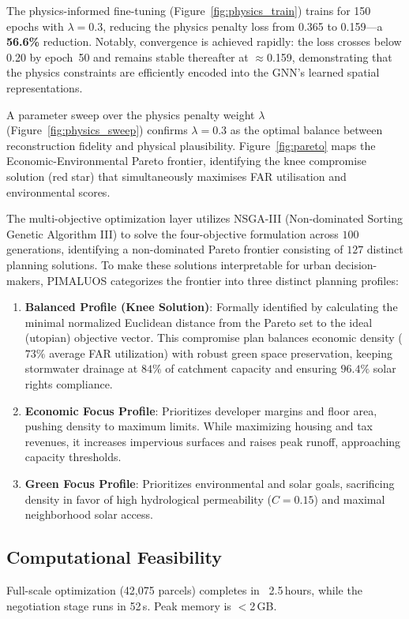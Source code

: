 \documentclass[final,3p,times]{elsarticle}
\begin{document}
The physics-informed fine-tuning (Figure~\ref{fig:physics_train}) trains for 150 epochs with $\lambda=0.3$, reducing the physics penalty loss from 0.365 to 0.159—a \textbf{56.6\%} reduction. Notably, convergence is achieved rapidly: the loss crosses below 0.20 by epoch~50 and remains stable thereafter at $\approx$0.159, demonstrating that the physics constraints are efficiently encoded into the GNN's learned spatial representations.

A parameter sweep over the physics penalty weight $\lambda$ (Figure~\ref{fig:physics_sweep}) confirms $\lambda=0.3$ as the optimal balance between reconstruction fidelity and physical plausibility. Figure~\ref{fig:pareto} maps the Economic-Environmental Pareto frontier, identifying the knee compromise solution (red star) that simultaneously maximises FAR utilisation and environmental scores.

The multi-objective optimization layer utilizes NSGA-III (Non-dominated Sorting Genetic Algorithm III) to solve the four-objective formulation across $100$ generations, identifying a non-dominated Pareto frontier consisting of $127$ distinct planning solutions. To make these solutions interpretable for urban decision-makers, PIMALUOS categorizes the frontier into three distinct planning profiles:
\begin{enumerate}
    \item \textbf{Balanced Profile (Knee Solution)}: Formally identified by calculating the minimal normalized Euclidean distance from the Pareto set to the ideal (utopian) objective vector. This compromise plan balances economic density ($73\%$ average FAR utilization) with robust green space preservation, keeping stormwater drainage at $84\%$ of catchment capacity and ensuring $96.4\%$ solar rights compliance.
    \item \textbf{Economic Focus Profile}: Prioritizes developer margins and floor area, pushing density to maximum limits. While maximizing housing and tax revenues, it increases impervious surfaces and raises peak runoff, approaching capacity thresholds.
    \item \textbf{Green Focus Profile}: Prioritizes environmental and solar goals, sacrificing density in favor of high hydrological permeability ($C = 0.15$) and maximal neighborhood solar access.
\end{enumerate}

\subsection{Computational Feasibility}
Full-scale optimization (42,075 parcels) completes in ~2.5\,hours, while the negotiation stage runs in 52\,s. Peak memory is $<$2\,GB.
\end{document}
